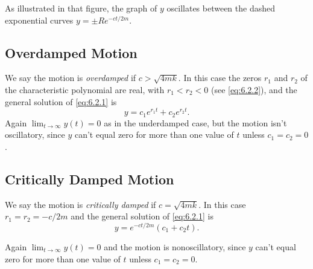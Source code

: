 \documentclass{ximera}
\begin{document}
As illustrated in that figure, the graph of $y$
oscillates between the dashed exponential curves $y=\pm Re^{-ct/2m}$.
 
\subsection*{Overdamped Motion}
 
We say the motion is \textit{overdamped} if $c>\sqrt{4mk}$. In this
case the zeros $r_1$ and $r_2$ of the characteristic polynomial are
real, with $r_1<r_2<0$ (see \eqref{eq:6.2.2}), and the general solution of
\eqref{eq:6.2.1} is
$$
y=c_1e^{r_1t}+c_2e^{r_2t}.
$$
Again $\lim_{t\rightarrow\infty}y(t)=0$ as in the
underdamped case, but the motion isn't  oscillatory, since $y$ can't
equal zero for more than one value of $t$ unless $c_1=c_2=0$.
 
\subsection*{Critically Damped Motion}
 
We say the motion is \textit{critically damped} if $c=\sqrt{4mk}$. In
this case $r_1=r_2=-c/2m$ and the general solution of \eqref{eq:6.2.1} is
$$
y=e^{-ct/2m}(c_1+c_2t).
$$
 
Again $\lim_{t\rightarrow\infty}y(t)=0$ and the motion is nonoscillatory,
since $y$ can't equal zero for more than one value of $t$ unless
$c_1=c_2=0$. %
 
\end{document}
